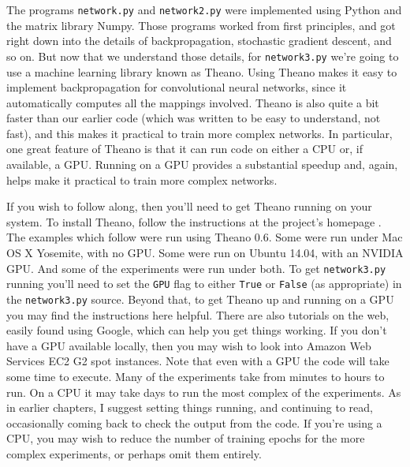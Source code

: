 The programs \lstinline{network.py} and \lstinline{network2.py} were implemented using Python and the matrix library Numpy. Those programs worked from first principles, and got right down into the details of backpropagation, stochastic gradient descent, and so on. But now that we understand those details, for \lstinline{network3.py} we're going to use a machine learning library known as Theano.
Using Theano makes it easy to implement backpropagation for convolutional neural networks, since it automatically computes all the mappings involved. Theano is also quite a bit faster than our earlier code (which was written to be easy to understand, not fast), and this makes it practical to train more complex networks. In particular, one great feature of Theano is that it can run code on either a CPU or, if available, a GPU. Running on a GPU provides a substantial speedup and, again, helps make it practical to train more complex networks.

If you wish to follow along, then you'll need to get Theano running on your system. To install Theano, follow the instructions at the project's homepage \cite{theano2019}. The examples which follow were run using Theano 0.6. Some were run under Mac OS X Yosemite, with no GPU. Some were run on Ubuntu 14.04, with an NVIDIA GPU. And some of the experiments were run under both. To get \lstinline{network3.py} running you'll need to set the \lstinline{GPU} flag to either \lstinline{True} or \lstinline{False} (as appropriate) in the \lstinline{network3.py} source. Beyond that, to get Theano up and running on a GPU you may find the instructions here \cite{theanogpu2018} helpful. There are also tutorials on the web, easily found using Google, which can help you get things working. If you don't have a GPU available locally, then you may wish to look into Amazon Web Services EC2 G2 spot instances. Note that even with a GPU the code will take some time to execute. Many of the experiments take from minutes to hours to run. On a CPU it may take days to run the most complex of the experiments. As in earlier chapters, I suggest setting things running, and continuing to read, occasionally coming back to check the output from the code. If you're using a CPU, you may wish to reduce the number of training epochs for the more complex experiments, or perhaps omit them entirely.

